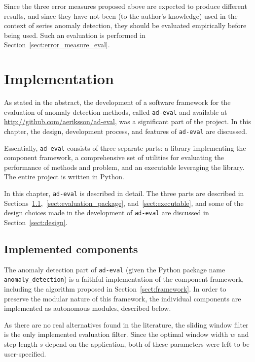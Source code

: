 Since the three error measures proposed above are expected to produce different results, and since they have not been (to the author's knowledge) used in the context of series anomaly detection, they should be evaluated empirically before being used. Such an evaluation is performed in Section~\ref{sect:error_measure_eval}.

\section{Implementation}
\label{ch:implementation}

As stated in the abstract, the development of a software framework for the evaluation of anomaly detection methods, called \texttt{ad-eval} and available at \url{http://github.com/aeriksson/ad-eval}, was a significant part of the project. In this chapter, the design, development process, and features of \texttt{ad-eval} are discussed.

Essentially, \texttt{ad-eval} consists of three separate parts: a library implementing the component framework, a comprehensive set of utilities for evaluating the performance of methods and problem, and an executable leveraging the library. The entire project is written in Python.

In this chapter, \texttt{ad-eval} is described in detail. The three parts are described in Sections~\ref{sect:implemented_problems},~\ref{sect:evaluation_package}, and~\ref{sect:executable}, and some of the design choices made in the development of \texttt{ad-eval} are discussed in Section~\ref{sect:design}.

\subsection{Implemented components}
\label{sect:implemented_problems}

The anomaly detection part of \texttt{ad-eval} (given the Python package name \texttt{anomaly\_detection}) is a faithful implementation of the component framework, including the algorithm proposed in Section~\ref{sect:framework}. In order to preserve the modular nature of this framework, the individual components are implemented as autonomous modules, described below.

As there are no real alternatives found in the literature, the sliding window filter is the only implemented evaluation filter. Since the optimal window width $w$ and step length $s$ depend on the application, both of these parameters were left to be user-specified.

